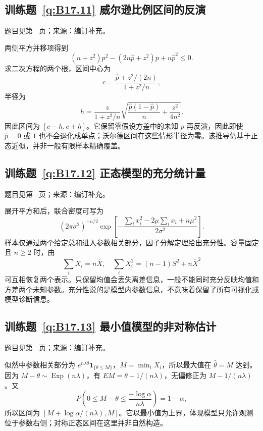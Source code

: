 \subsection*{训练题~\ref{q:B17.11} 威尔逊比例区间的反演}\label{a:B17.11}{\small 题目见第~\pageref{q:B17.11} 页；来源：编订补充。}
\begin{solve}两侧平方并移项得到\[(n+z^2)p^2-(2n\widehat p+z^2)p+n\widehat p^2\le0.\]求二次方程的两个根，区间中心为\[c=\frac{\widehat p+z^2/(2n)}{1+z^2/n},\]半径为\[h=\frac{z}{1+z^2/n}\sqrt{\frac{\widehat p(1-\widehat p)}n+\frac{z^2}{4n^2}}.\]因此区间为 $[c-h,c+h]$。它保留零假设方差中的未知 $p$ 再反演，因此即使 $\widehat p=0$ 或 $1$ 也不会退化成单点；沃尔德区间在这些情形半径为零。该推导仍基于正态近似，并非一般有限样本精确覆盖。\end{solve}

\subsection*{训练题~\ref{q:B17.12} 正态模型的充分统计量}\label{a:B17.12}{\small 题目见第~\pageref{q:B17.12} 页；来源：编订补充。}
\begin{solve}展开平方和后，联合密度可写为\[(2\pi\sigma^2)^{-n/2}\exp\left[-\frac{\sum_i x_i^2-2\mu\sum_i x_i+n\mu^2}{2\sigma^2}\right].\]样本仅通过两个给定总和进入参数相关部分，因子分解定理给出充分性。容量固定且 $n\ge2$ 时，由\[\sum_iX_i=n\overline X,\quad\sum_iX_i^2=(n-1)S^2+n\overline X^2\]可互相恢复两个表示。只保留均值会丢失离差信息，一般不能同时充分反映均值和方差两个未知参数。充分性说的是模型内参数信息，不意味着保留了所有可视化或模型诊断信息。\end{solve}

\subsection*{训练题~\ref{q:B17.13} 最小值模型的非对称估计}\label{a:B17.13}{\small 题目见第~\pageref{q:B17.13} 页；来源：编订补充。}
\begin{solve}似然中参数相关部分为 $e^{n\lambda\theta}\mathbf1_{\{\theta\le M\}}$，$M=\min_iX_i$，所以最大值在 $\widehat\theta=M$ 达到。因为 $M-\theta\sim\operatorname{Exp}(n\lambda)$，有 $EM=\theta+1/(n\lambda)$，无偏修正为 $M-1/(n\lambda)$。又\[P\left(0\le M-\theta\le\frac{-\log\alpha}{n\lambda}\right)=1-\alpha,\]所以区间为 $[M+\log\alpha/(n\lambda),M]$。它以最小值为上界，体现模型只允许观测位于参数右侧；对称正态区间在这里并非自然构造。\end{solve}


